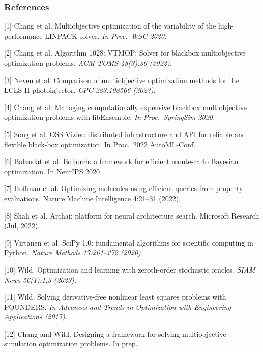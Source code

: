 \documentclass[aspectratio=169]{beamer}
\begin{document}
\begin{frame}\frametitle{References}

{\tiny\it

[1] Chang et al.
Multiobjective optimization of the variability of the high-performance 
LINPACK solver.
{\sl In Proc.\ WSC 2020.}

\medskip

[2] Chang et al.
Algorithm 1028: VTMOP: Solver for blackbox multiobjective optimization problems.
{\sl ACM TOMS 48(3):36 (2022).}

\medskip

[3] Neveu et al.
Comparison of multiobjective optimization methods for the LCLS-II photoinjector.
{\sl CPC 283:108566 (2023).}

\medskip

[4] Chang et al.
Managing computationally expensive blackbox multiobjective optimization
problems with libEnsemble.
{\sl In Proc.\ SpringSim 2020.}

\medskip

[5] Song et al.
OSS Vizier: distributed infrastructure and API for reliable and flexible black-box optimization.
In Proc.\ 2022 AutoML-Conf.

\medskip

[6] Balandat et al.
BoTorch: a framework for efficient monte-carlo Bayesian optimization.
In NeurIPS 2020.

\medskip

[7] Hoffman et al.
Optimizing molecules using efficient queries from property evaluations.
Nature Machine Intelligence 4:21--31 (2022).

\medskip

[8] Shah et al.
Archai: platform for neural architecture search.
Microsoft Research (Jul, 2022).

\medskip

[9] Virtanen et al.
SciPy 1.0: fundamental algorithms for scientific computing in Python.
{\sl Nature Methods 17:261--272 (2020).}

\medskip

[10] Wild. Optimization and learning with zeroth-order stochastic oracles.
{\sl SIAM News 56(1):1,3 (2023).}

\medskip

[11] Wild.
Solving derivative-free nonlinear least squares problems with POUNDERS.
{\sl In Advances and Trends in Optimization with Engineering Applications
(2017).}

\medskip

[12]
Chang and Wild.
Designing a framework for solving multiobjective simulation optimization problems.
In prep.

}
\end{frame}
\end{document}
